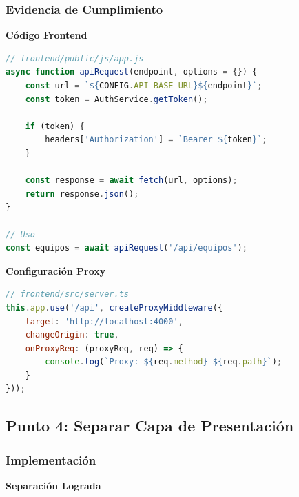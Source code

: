 \documentclass[12pt,a4paper]{article}
\begin{document}
\subsubsection{Evidencia de Cumplimiento}

\textbf{Código Frontend}
\begin{lstlisting}[language=javascript]
// frontend/public/js/app.js
async function apiRequest(endpoint, options = {}) {
    const url = `${CONFIG.API_BASE_URL}${endpoint}`;
    const token = AuthService.getToken();

    if (token) {
        headers['Authorization'] = `Bearer ${token}`;
    }

    const response = await fetch(url, options);
    return response.json();
}

// Uso
const equipos = await apiRequest('/api/equipos');
\end{lstlisting}

\textbf{Configuración Proxy}
\begin{lstlisting}[language=javascript]
// frontend/src/server.ts
this.app.use('/api', createProxyMiddleware({
    target: 'http://localhost:4000',
    changeOrigin: true,
    onProxyReq: (proxyReq, req) => {
        console.log(`Proxy: ${req.method} ${req.path}`);
    }
}));
\end{lstlisting}

\subsection{Punto 4: Separar Capa de Presentación}

\subsubsection{Implementación}

\textbf{Separación Lograda}
\end{document}
